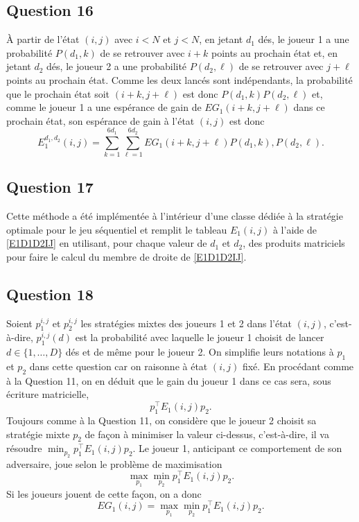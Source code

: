 \documentclass[a4paper,11pt]{amsart}
\theoremstyle{plain}
\begin{document}
\subsection{Question 16}

À partir de l'état $(i, j)$ avec $i < N$ et $j < N$, en jetant $d_1$ dés, le joueur 1 a une probabilité $P(d_1, k)$ de se retrouver avec $i+k$ points au prochain état et, en jetant $d_2$ dés, le joueur 2 a une probabilité $P(d_2, \ell)$ de se retrouver avec $j + \ell$ points au prochain état. Comme les deux lancés sont indépendants, la probabilité que le prochain état soit $(i+k, j+\ell)$ est donc $P(d_1, k) P(d_2, \ell)$ et, comme le joueur 1 a une espérance de gain de $EG_1(i+k, j+\ell)$ dans ce prochain état, son espérance de gain à l'état $(i, j)$ est donc
\begin{equation}
\label{E1D1D2IJ}
E_1^{d_1, d_2}(i, j) = \sum_{k = 1}^{6 d_1} \sum_{\ell = 1}^{6 d_2} EG_1(i+k, j+\ell) P(d_1, k), P(d_2, \ell).
\end{equation}

\subsection{Question 17}

Cette méthode a été implémentée à l'intérieur d'une classe dédiée à la stratégie optimale pour le jeu séquentiel et remplit le tableau $E_1(i, j)$ à l'aide de \eqref{E1D1D2IJ} en utilisant, pour chaque valeur de $d_1$ et $d_2$, des produits matriciels pour faire le calcul du membre de droite de \eqref{E1D1D2IJ}.

\subsection{Question 18}

Soient $p_1^{i, j}$ et $p_2^{i, j}$ les stratégies mixtes des joueurs 1 et 2 dans l'état $(i, j)$, c'est-à-dire, $p_1^{i, j}(d)$ est la probabilité avec laquelle le joueur 1 choisit de lancer $d \in \{1, \dotsc, D\}$ dés et de même pour le joueur 2. On simplifie leurs notations à $p_1$ et $p_2$ dans cette question car on raisonne à état $(i, j)$ fixé. En procédant comme à la Question 11, on en déduit que le gain du joueur 1 dans ce cas sera, sous écriture matricielle,
\[
p_1^\top E_1(i, j) p_2.
\]
Toujours comme à la Question 11, on considère que le joueur 2 choisit sa stratégie mixte $p_2$ de façon à minimiser la valeur ci-dessus, c'est-à-dire, il va résoudre $\min_{p_2} p_1^\top E_1(i, j) p_2$. Le joueur 1, anticipant ce comportement de son adversaire, joue selon le problème de maximisation
\[\max_{p_1} \min_{p_2} p_1^\top E_1(i, j) p_2.\]
Si les joueurs jouent de cette façon, on a donc
\[
EG_1(i, j) = \max_{p_1} \min_{p_2} p_1^\top E_1(i, j) p_2.
\]
\end{document}
